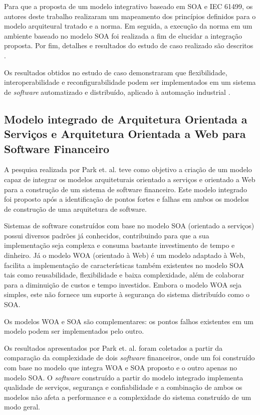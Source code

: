Para que a proposta de um modelo integrativo baseado em SOA e IEC 61499, os autores deste trabalho realizaram um mapeamento dos princípios definidos para o modelo arquiteural tratado e a norma. Em seguida, a execução da norma em um ambiente baseado no modelo SOA foi realizada a fim de elucidar a integração proposta. Por fim, detalhes e resultados do estudo de caso realizado são descritos \cite{dai_bridging_2015}.

Os resultados obtidos no estudo de caso demonstraram que flexibilidade, interoperabilidade e reconfigurabilidade podem ser implementados em um sistema de \textit{software} automatizado e distribuído, aplicado à automação industrial \cite{dai_bridging_2015}.


\subsection{Modelo integrado de Arquitetura Orientada a Serviços e Arquitetura Orientada a Web para Software Financeiro}
A pesquisa realizada por Park et. al. \cite{park_integrated_2012} teve como objetivo a criação de um modelo capaz de integrar os modelos arquiteturais orientado a serviços e orientado a Web para a construção de um sistema de software financeiro. Este modelo integrado foi proposto após a identificação de pontos fortes e falhas em ambos os modelos de construção de uma arquitetura de software.

Sistemas de software construídos com base no modelo SOA (orientado a serviços) possui diversos padrões já conhecidos, contribuindo para que a sua implementação seja complexa e consuma bastante investimento de tempo e dinheiro. Já o modelo WOA (orientado à Web) é um modelo adaptado à Web, facilita a implementação de características também existentes no modelo SOA tais como reusabilidade, flexibilidade e baixa complexidade, além de colaborar para a diminuição de custos e tempo investidos. Embora o modelo WOA seja simples, este não fornece um suporte à segurança do sistema distribuído como o SOA.

Os modelos WOA e SOA são complementares: os pontos falhos existentes em um modelo podem ser implementados pelo outro.

Os resultados apresentados por Park et. al. \cite{park_integrated_2012} foram coletados a partir da comparação da complexidade de dois \textit{software} financeiros, onde um foi construído com base no modelo que integra WOA e SOA proposto e o outro apenas no modelo SOA. O \textit{software} construído a partir do modelo integrado implementa qualidade de serviços, segurança e confiabilidade e a combinação de ambos os modelos não afeta a performance e a complexidade do sistema construído de um modo geral.

